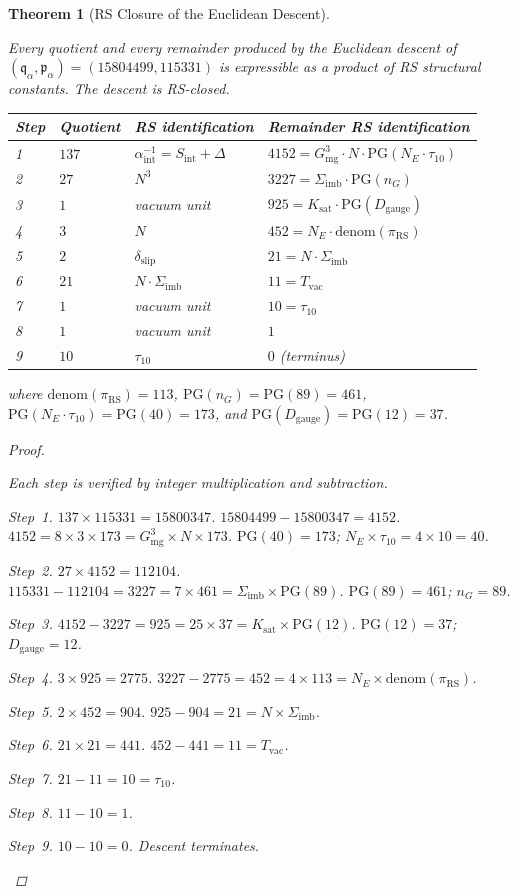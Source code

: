 \documentclass[11pt,letterpaper]{article}
\theoremstyle{plain}
\newtheorem{theorem}{Theorem}[section]
\theoremstyle{definition}
\theoremstyle{remark}
\newcommand{\Dg}{D_{\mathrm{gauge}}}
\newcommand{\Sint}{S_{\mathrm{int}}}
\newcommand{\Sigimb}{\Sigma_{\mathrm{imb}}}
\newcommand{\PG}{\mathrm{PG}}
\newcommand{\Gmg}{G_{\mathrm{mg}}}
\newcommand{\Ksat}{K_{\mathrm{sat}}}
\newcommand{\dslip}{\delta_{\mathrm{slip}}}
\newcommand{\Tvac}{T_{\mathrm{vac}}}
\newcommand{\tauX}{\tau_{10}}
\newcommand{\nG}{n_G}
\newcommand{\aSC}{\alpha^{-1}_{\mathrm{int}}}
\newcommand{\piRS}{\pi_{\mathrm{RS}}}
\newcommand{\pa}{\mathfrak{p}_\alpha}
\newcommand{\qa}{\mathfrak{q}_\alpha}
\begin{document}
\begin{theorem}[RS Closure of the Euclidean
Descent]\label{thm:descent-closed}
\begin{rsbox}
Every quotient and every remainder produced by the Euclidean descent
of $(\qa,\pa)=(15804499,115331)$ is expressible as a product of RS
structural constants.  The descent is RS-closed.

\begin{center}
\small
\begin{tabular}{llll}
\toprule
Step & Quotient & RS identification
& Remainder RS identification \\
\midrule
1 & $137$ & $\aSC=\Sint+\Delta$
  & $4152=\Gmg^3\cdot N\cdot\PG(N_E\cdot\tauX)$ \\
2 & $27$ & $N^3$
  & $3227=\Sigimb\cdot\PG(\nG)$ \\
3 & $1$ & vacuum unit
  & $925=\Ksat\cdot\PG(\Dg)$ \\
4 & $3$ & $N$
  & $452=N_E\cdot\mathrm{denom}(\piRS)$ \\
5 & $2$ & $\dslip$
  & $21=N\cdot\Sigimb$ \\
6 & $21$ & $N\cdot\Sigimb$
  & $11=\Tvac$ \\
7 & $1$ & vacuum unit
  & $10=\tauX$ \\
8 & $1$ & vacuum unit
  & $1$ \\
9 & $10$ & $\tauX$
  & $0$ (terminus) \\
\bottomrule
\end{tabular}
\end{center}
where $\mathrm{denom}(\piRS)=113$, $\PG(\nG)=\PG(89)=461$,
$\PG(N_E\cdot\tauX)=\PG(40)=173$, and $\PG(\Dg)=\PG(12)=37$.
\end{rsbox}
\begin{proof}
\begin{rsbox}
Each step is verified by integer multiplication and subtraction.

\textit{Step~1.} $137\times115331=15800347$.
$15804499-15800347=4152$.
$4152=8\times3\times173=\Gmg^3\times N\times173$.
$\PG(40)=173$; $N_E\times\tauX=4\times10=40$.

\textit{Step~2.} $27\times4152=112104$.
$115331-112104=3227=7\times461=\Sigimb\times\PG(89)$.
$\PG(89)=461$; $\nG=89$.

\textit{Step~3.} $4152-3227=925=25\times37=\Ksat\times\PG(12)$.
$\PG(12)=37$; $\Dg=12$.

\textit{Step~4.} $3\times925=2775$. $3227-2775=452=4\times113
=N_E\times\mathrm{denom}(\piRS)$.

\textit{Step~5.} $2\times452=904$. $925-904=21=N\times\Sigimb$.

\textit{Step~6.} $21\times21=441$. $452-441=11=\Tvac$.

\textit{Step~7.} $21-11=10=\tauX$.

\textit{Step~8.} $11-10=1$.

\textit{Step~9.} $10-10=0$. Descent terminates.
\end{rsbox}
\end{proof}
\end{theorem}
\end{document}
